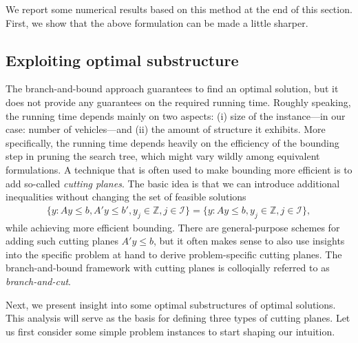 \documentclass[a4paper]{report}
\theoremstyle{definition}
\theoremstyle{plain}
\begin{document}
We report some numerical results based on this method at the end of this
section. First, we show that the above formulation can be made a little sharper.


\subsection{Exploiting optimal substructure}\label{sec:cutting-planes}

The branch-and-bound approach guarantees to find an optimal solution, but it
does not provide any guarantees on the required running time.
%
Roughly speaking, the running time depends mainly on two aspects: (i) size of
the instance---in our case: number of vehicles---and (ii) the amount of structure it
exhibits.
%
More specifically, the running time depends heavily on the efficiency of the
bounding step in pruning the search tree, which might vary wildly among
equivalent formulations.
%
A technique that is often used to make bounding more efficient is to add
so-called \emph{cutting planes}.
%
The basic idea is that we can introduce additional inequalities
without changing the set of feasible solutions
\begin{align}
  \{ y : Ay \leq b, A'y \leq b', y_j \in \mathbb{Z}, j \in \mathcal{I} \} = \{ y : Ay \leq b, y_j \in \mathbb{Z}, j \in \mathcal{I} \} ,
\end{align}
while achieving more efficient bounding.
%
There are general-purpose schemes for adding such cutting planes $A' y \leq b$,
but it often makes sense to also use insights into the specific problem at hand
to derive problem-specific cutting planes.
%
The branch-and-bound framework with cutting planes is colloqially referred to as
\emph{branch-and-cut}.

Next, we present insight into some optimal substructures of optimal solutions.
This analysis will serve as the basis for defining three types of cutting
planes.
%
Let us first consider some simple problem instances to start shaping our
intuition.
\end{document}
